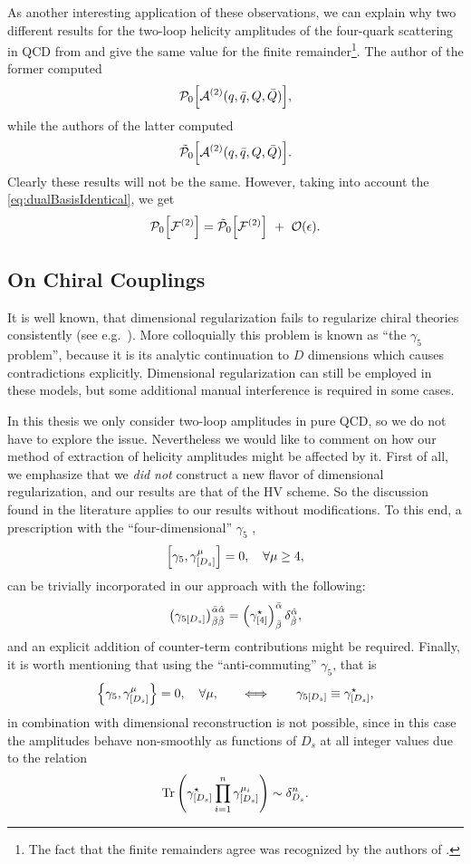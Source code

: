 As another interesting application of these observations, we can explain why 
two different results for the two-loop helicity amplitudes of the four-quark scattering in QCD
from \cite{Glover:2004si} and \cite{DeFreitas:2004kmi} give the same
value for the finite remainder\footnote{The fact that the finite remainders agree was recognized by the authors of \cite{DeFreitas:2004kmi}.}.
The author of the former computed 
\[
  \mathcal{P}_0\qty[\mathcal{A}^{(2)}(q,\bar{q},Q,\bar{Q})],
\]
while the authors of the latter computed
\[
  \tilde{\mathcal{P}}_0\qty[\mathcal{A}^{(2)}(q,\bar{q},Q,\bar{Q})].
\]
Clearly these results will not be the same. 
However, taking into account the \cref{eq:dualBasisIdentical}, we get
\[
  \mathcal{P}_0\qty[\mathcal{F}^{(2)}] = \tilde{\mathcal{P}}_0\qty[\mathcal{F}^{(2)}] ~+~ \order{\epsilon}.
\]

\subsection{On Chiral Couplings}

It is well known, that dimensional regularization fails to regularize chiral theories consistently
(see e.g.\ \cite{Larin:1993tq,Boughezal:2019xpp,Jegerlehner:2000dz,Bonneau:1980yb,Bruque:2018bmy,Baikov:1991qz,Kreimer:1989ke}).
More colloquially this problem is known as ``the $\gamma_5$ problem'', because it is its analytic
continuation to $D$ dimensions which causes contradictions explicitly.
Dimensional regularization can still be employed in these models, 
but some additional manual interference is required in some cases. 

In this thesis we only consider two-loop amplitudes in pure QCD, so we do not have to explore the issue. 
Nevertheless we would like to comment on how our method of extraction of helicity amplitudes might be affected by it.
First of all, we emphasize that we \emph{did not} construct a new flavor of dimensional regularization,
and our results are that of the HV scheme.  So the discussion found in the literature applies to our results without modifications.
To this end, a prescription with  the ``four-dimensional'' $\gamma_5$ \cite{tHooft:1972tcz,Breitenlohner:1977hr,Larin:1993tq},
\[\commutator{\gamma_{5}}{\gamma^{\mu}_{[D_s]}}=0, \quad \forall \mu\geq 4,\]
can be trivially incorporated in our approach with the following:
\[
  \qty(\gamma_{5[D_s]})^{\bar{\alpha}\hat{\alpha}}_{\bar{\beta}\hat{\beta}} = \qty(\gamma^\star_{[4]})^{\bar{\alpha}}_{\bar{\beta}}\,\delta^{\hat{\alpha}}_{\hat{\beta}},
\]
and an explicit addition of counter-term contributions might be required.
Finally, it is worth mentioning that using the ``anti-commuting'' $\gamma_5$, that is
\[
  \anticommutator{\gamma_{5}}{\gamma^{\mu}_{[D_s]}}=0, \quad \forall \mu, \qquad\Longleftrightarrow\qquad \gamma_{5[D_s]} \equiv \gamma^\star_{[D_s]},
\]
in combination with dimensional reconstruction is not possible, since
in this case the amplitudes behave non-smoothly as functions of $D_s$ at all integer values due to the relation
\begin{equation}
  \Tr\qty(\gamma^\star_{[D_s]} \prod_{i=1}^{n} \gamma^{\mu_i}_{[D_s]}) \sim \delta^n_{D_s}.
\end{equation}


